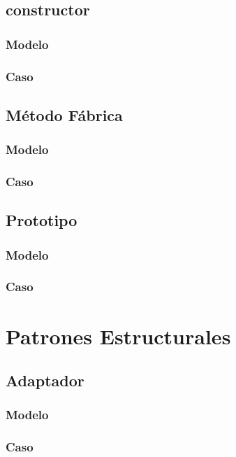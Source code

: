 \subsection{constructor}
\subsubsection{Modelo}
\newpage
\subsubsection{Caso}
\newpage

\subsection{Método Fábrica}
\subsubsection{Modelo}
\newpage
\subsubsection{Caso}
\newpage

\subsection{Prototipo}
\subsubsection{Modelo}
\newpage
\subsubsection{Caso}
\newpage

\section{Patrones Estructurales}

\subsection{Adaptador}
\subsubsection{Modelo}
\newpage
\subsubsection{Caso}
\newpage


